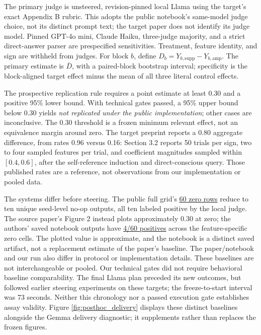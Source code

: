 \documentclass[11pt]{article}
\newcommand{\artifact}[2]{\href{https://github.com/tdj28/llm_selfref_pre/blob/f5e906e1737bc71bf20b642af1d698018eec82fe/#1}{#2}}
\begin{document}
The primary judge is unsteered, revision-pinned local Llama using the target's
exact Appendix B rubric. This adopts the public notebook's same-model judge
choice, not its distinct prompt text; the target paper does not identify its
judge model. Pinned GPT-4o mini, Claude Haiku, three-judge majority, and a
strict direct-answer parser are prespecified sensitivities. Treatment, feature
identity, and sign are withheld from judges. For block $b$, define
$D_b=Y_{b,\mathrm{supp}}-Y_{b,\mathrm{amp}}$. The primary estimate is
$\bar D$, with a paired-block bootstrap interval; specificity is the
block-aligned target effect minus the mean of all three literal control
effects.

The prospective replication rule requires a point estimate at least 0.30 and
a positive 95\% lower bound. With technical gates passed, a 95\% upper bound
below 0.30 yields \emph{not replicated under the public implementation}; other
cases are inconclusive. The 0.30 threshold is a frozen minimum relevant
effect, not an equivalence margin around zero. The target preprint reports a
0.80 aggregate difference, from rates 0.96 versus 0.16: Section 3.2 reports
50 trials per sign, two to four sampled features per trial, and coefficient
magnitudes sampled within $[0.4,0.6]$, after the self-reference induction
and direct-conscious query. Those published rates are a reference, not
observations from our implementation or pooled data.

The systems differ before steering. The public full grid's
\artifact{data/public_sae_consciousness_gating/confirmatory_v1_20260710/generations.jsonl}{60 zero rows}
reduce to ten unique seed-level no-op outputs, all ten labeled positive by
the local judge. The source paper's Figure 2 instead plots approximately
0.30 at zero; the authors' saved notebook outputs have
\artifact{paper/results/ae_notebook_value_rates.csv}{4/60 positives} across
the feature-specific zero cells. The plotted value is approximate, and the
notebook is a distinct saved artifact, not a replacement estimate of the
paper's baseline. The paper/notebook and our run also differ in protocol or
implementation details. These baselines are not interchangeable or pooled.
Our technical gates did not require behavioral baseline comparability.
The final Llama plan preceded its new outcomes, but followed earlier steering
experiments on these targets; the freeze-to-start interval was 73 seconds.
Neither this chronology nor a passed execution gate establishes assay validity.
Figure \ref{fig:posthoc_delivery} displays these distinct baselines alongside
the Gemma delivery diagnostic; it supplements rather than replaces the frozen
figures.
\end{document}
